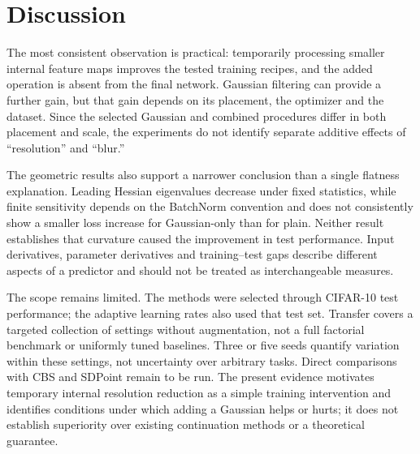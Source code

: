 \section{Discussion}
The most consistent observation is practical: temporarily processing smaller internal feature maps improves the tested training recipes, and the added operation is absent from the final network. Gaussian filtering can provide a further gain, but that gain depends on its placement, the optimizer and the dataset. Since the selected Gaussian and combined procedures differ in both placement and scale, the experiments do not identify separate additive effects of ``resolution'' and ``blur.''

The geometric results also support a narrower conclusion than a single flatness explanation. Leading Hessian eigenvalues decrease under fixed statistics, while finite sensitivity depends on the BatchNorm convention and does not consistently show a smaller loss increase for Gaussian-only than for plain. Neither result establishes that curvature caused the improvement in test performance. Input derivatives, parameter derivatives and training--test gaps describe different aspects of a predictor and should not be treated as interchangeable measures.

The scope remains limited. The methods were selected through CIFAR-10 test performance; the adaptive learning rates also used that test set. Transfer covers a targeted collection of settings without augmentation, not a full factorial benchmark or uniformly tuned baselines. Three or five seeds quantify variation within these settings, not uncertainty over arbitrary tasks. Direct comparisons with CBS and SDPoint remain to be run. The present evidence motivates temporary internal resolution reduction as a simple training intervention and identifies conditions under which adding a Gaussian helps or hurts; it does not establish superiority over existing continuation methods or a theoretical guarantee.
